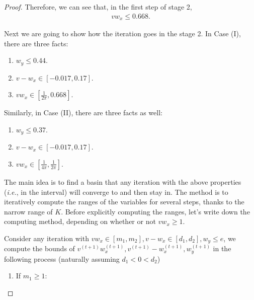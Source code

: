 \documentclass{article}
\theoremstyle{plain}
\theoremstyle{remark}
\def\tt{^{(t+1)}}
\begin{document}
\begin{proof}
Therefore, we can see that, in the first step of stage 2,
\begin{align}
    v w_x\le 0.668.
\end{align}


Next we are going to show how the iteration goes in the stage 2. In Case (I), there are three facts:
\begin{enumerate}
    \item $w_y\le 0.44$.
    \item $v-w_x\in[-0.017, 0.17]$.
    \item $vw_x \in[\frac{1}{2\pi}, 0.668]$.
\end{enumerate}
Similarly, in Case (II), there are three facts as well:
\begin{enumerate}
    \item $w_y\le 0.37$.
    \item $v-w_x\in[-0.017, 0.17]$.
    \item $vw_x \in[\frac{1}{4\pi}, \frac{1}{2\pi}]$.
\end{enumerate}

The main idea is to find a basin that any iteration with the above properties (\textit{i.e.}, in the interval) will converge to and then stay in. The method is to iteratively compute the ranges of the variables for several steps, thanks to the narrow range of $K$. Before explicitly computing the ranges, let's write down the computing method, depending on whether or not $v w_x\ge1$.

Consider any iteration with $v w_x\in[m_1,m_2], v-w_x\in[d_1,d_2], w_y\le e$, we compute the bounds of $v\tt w_x\tt, v\tt-w_x\tt, w_y\tt$ in the following process (naturally assuming $d_1<0<d_2$)
\begin{enumerate}
    \item If $m_1\ge 1$:
    

\end{enumerate}
\end{proof}
\end{document}
